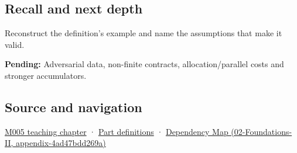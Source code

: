 \subsection{Recall and next depth}\label{recall-and-next-depth}

Reconstruct the definition's example and name the assumptions that make it valid.

\textbf{Pending:} Adversarial data, non-finite contracts, allocation/parallel costs and stronger accumulators.

\subsection{Source and navigation}\label{source-and-navigation}

\href{Continuous\%20Notes/Computing\%20Foundations\%20-\%20From\%20Bits\%20to\%20C++\%20and\%20Systems\%20APIs\#When\%20arithmetic\%20meets\%20uncertainty}{M005 teaching chapter} · \hyperref[appendix-fd090d982a15]{Part definitions} · \href{}{Dependency Map (02-Foundations-II, appendix-4ad47bdd269a)}
